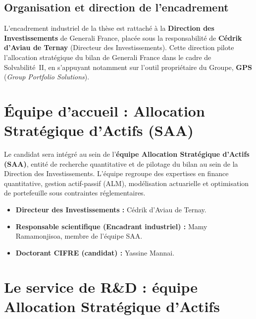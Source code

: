 \documentclass[10pt,a4paper]{article}
\begin{document}
\subsection{Organisation et direction de l'encadrement}

L'encadrement industriel de la thèse est rattaché à la \textbf{Direction des
Investissements} de Generali France, placée sous la responsabilité de
\textbf{Cédrik d'Aviau de Ternay} (Directeur des Investissements).  Cette
direction pilote l'allocation stratégique du bilan de Generali France dans le
cadre de Solvabilité~II, en s'appuyant notamment sur l'outil propriétaire du
Groupe, \textbf{GPS} (\textit{Group Portfolio Solutions}).

\section{Équipe d'accueil : Allocation Stratégique d'Actifs (SAA)}

Le candidat sera intégré au sein de l'\textbf{équipe Allocation Stratégique
d'Actifs (SAA)}, entité de recherche quantitative et de pilotage du bilan au
sein de la Direction des Investissements.  L'équipe regroupe des expertises en
finance quantitative, gestion actif-passif (ALM), modélisation actuarielle et
optimisation de portefeuille sous contraintes réglementaires.

\begin{itemize}[leftmargin=1.6em,itemsep=1pt]
  \item \textbf{Directeur des Investissements :} Cédrik d'Aviau de Ternay.
  \item \textbf{Responsable scientifique (Encadrant industriel) :}
        Mamy Ramamonjisoa, membre de l'équipe SAA.
  \item \textbf{Doctorant CIFRE (candidat) :} Yassine Mannai.
\end{itemize}

\section{Le service de R\&D : équipe Allocation Stratégique d'Actifs}
\end{document}
